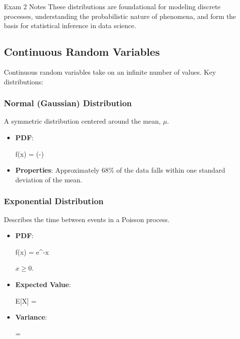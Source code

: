 \begin{examnotes}{Exam 2 Notes}
    These distributions are foundational for modeling discrete processes, understanding the probabilistic nature of phenomena, and form the basis for statistical inference in data science.
    
    \subsection*{Continuous Random Variables}
    Continuous random variables take on an infinite number of values. Key distributions:
    
    \subsubsection*{Normal (Gaussian) Distribution}
    A symmetric distribution centered around the mean, $\mu$.
    \begin{itemize}
        \item \textbf{PDF}:
        \begin{center}
            \begin{highlightbox}
                f(x) =  \exp\left(-\right)
            \end{highlightbox}
        \end{center}
        \item \textbf{Properties}: Approximately 68\% of the data falls within one standard deviation of the mean.
    \end{itemize}
    
    \subsubsection*{Exponential Distribution}
    Describes the time between events in a Poisson process.
    \begin{itemize}
        \item \textbf{PDF}:
        \begin{center}
            \begin{highlightbox}
                f(x) = \lambda e^{-\lambda x}
            \end{highlightbox}
        \end{center}
        $x \geq 0$.
        \item \textbf{Expected Value}:
        \begin{center}
            \begin{highlightbox}
                E[X] = 
            \end{highlightbox}
        \end{center}
        \item \textbf{Variance}:
        \begin{center}
            \begin{highlightbox}
                \nu = 
            \end{highlightbox}
        \end{center}
    \end{itemize}


\end{examnotes}
